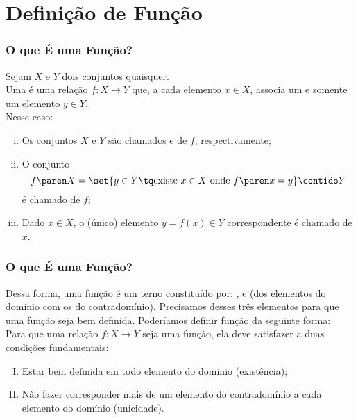 
\section{Definição de Função}
\begin{frame} \frametitle{O que É uma Função?}
\begin{definicao}
Sejam $X$ e $Y$ dois conjuntos quaisquer.\\
Uma  é uma relação $f: X \to Y$ que, a cada elemento $x
\in X$, associa um e somente um elemento $y \in Y$.\\
Nesse caso:
\begin{enumerate}[(i)]
	\item Os conjuntos $X$ e $Y$ são chamados  e
	 de $f$, respectivamente;
	\item O conjunto $$f\paren X = \set{y \in Y \tq \text{existe } x \in X \text{ onde } f \paren x =
	y} \contido Y$$ é chamado  de $f$;
	\item Dado $x \in X$, o (único) elemento $y = f(x) \in Y$
	correspondente é chamado  de $x$.
\end{enumerate}
\end{definicao}

\end{frame}


\begin{frame} \frametitle{O que É uma Função?} 

Dessa forma, uma função é um terno constituído por: ,
 e  (dos elementos do
domínio com os do contradomínio). Precisamos desses três elementos
para que uma função seja bem definida. Poderíamos definir
função da seguinte forma: \\
Para que uma relação $f: X \to Y$ seja
uma função, ela deve satisfazer a duas condições fundamentais:
\begin{enumerate}[(I)]
	\item Estar bem definida em todo elemento do domínio (existência);
	\item Não fazer corresponder mais de um elemento do contradomínio
	a cada elemento do domínio (unicidade).
\end{enumerate}

\end{frame}


